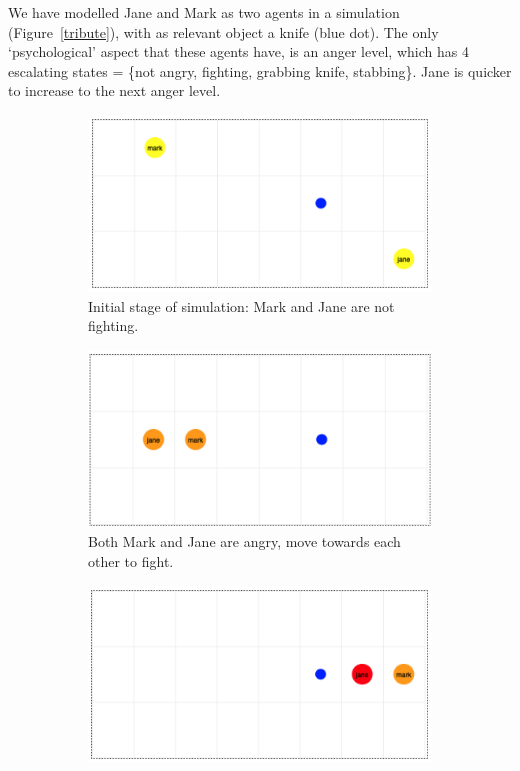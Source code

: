 \begin{example}

We have modelled Jane and Mark as two agents in a simulation (Figure~\ref{tribute}), with as relevant object a knife (blue dot). The only `psychological' aspect that these agents have, is an anger level, which has 4 escalating states = \{not angry, fighting, grabbing knife, stabbing\}. Jane is quicker to increase to the next anger level. 


\begin{figure}[htbp]
\begin{center}
\begin{subfigure}{.5\textwidth}
\includegraphics[width=0.9\linewidth]{images/walkthroughSim/s1.png}
\caption{Initial stage of simulation: Mark and Jane are not fighting.}
\label{default}
\end{subfigure}
\begin{subfigure}{.5\textwidth}
\includegraphics[width=0.9\linewidth]{images/walkthroughSim/s2.png}
\caption{Both Mark and Jane are angry, move towards each other to fight.}
\label{default}
\end{subfigure}
\begin{subfigure}{.5\textwidth}
\includegraphics[width=0.9\linewidth]{images/walkthroughSim/s3.png}

\end{subfigure}
\end{center}
\end{figure}
\end{example}
